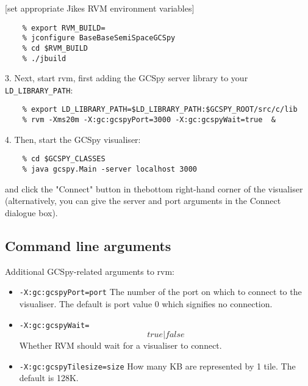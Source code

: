     [set appropriate Jikes RVM environment variables]
\begin{verbatim}
    % export RVM_BUILD=
    % jconfigure BaseBaseSemiSpaceGCSpy
    % cd $RVM_BUILD
    % ./jbuild
\end{verbatim}
   3. Next, start rvm, first adding the GCSpy server library to your {\tt LD\_LIBRARY\_PATH}:
\begin{verbatim}
    % export LD_LIBRARY_PATH=$LD_LIBRARY_PATH:$GCSPY_ROOT/src/c/lib
    % rvm -Xms20m -X:gc:gcspyPort=3000 -X:gc:gcspyWait=true  &
\end{verbatim}
   4. Then, start the GCSpy visualiser:
\begin{verbatim}
    % cd $GCSPY_CLASSES
    % java gcspy.Main -server localhost 3000
\end{verbatim}
      and click the "Connect" button in thebottom right-hand corner of the visualiser (alternatively, you can give the server and port arguments in the Connect dialogue box). 


\subsection{Command line arguments}

Additional GCSpy-related arguments to rvm:

\begin{itemize}
\item {\tt -X:gc:gcspyPort=port}
    The number of the port on which to connect to the visualiser.  The default is port value 0 which signifies no connection.
\item {\tt -X:gc:gcspyWait=\[true|false\]}
    Whether RVM should wait for a visualiser to connect.
\item {\tt -X:gc:gcspyTilesize=size}
    How many KB are represented by 1 tile.  The default is 128K.
\end{itemize}

